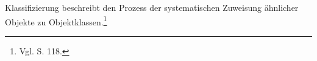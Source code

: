 Klassifizierung beschreibt den Prozess der systematischen Zuweisung ähnlicher Objekte zu Objektklassen.\footnote{Vgl. \cite{Elmasri.2009} S. 118.}